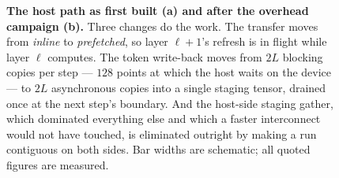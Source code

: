 \begin{figure}[t]
\begin{tikzpicture}
\end{tikzpicture}
\caption{\textbf{The host path as first built (a) and after the overhead campaign
(b).} Three changes do the work. The transfer moves from \emph{inline} to
\emph{prefetched}, so layer $\ell{+}1$'s refresh is in flight while layer $\ell$
computes. The token write-back moves from $2L$ blocking copies per step --- $128$
points at which the host waits on the device --- to $2L$ asynchronous copies into a
single staging tensor, drained once at the next step's boundary. And the host-side
staging gather, which dominated everything else and which a faster interconnect
would not have touched, is eliminated outright by making a run contiguous on both
sides. Bar widths are schematic; all quoted figures are measured.}
\label{fig:basevsopt}
\end{figure}
